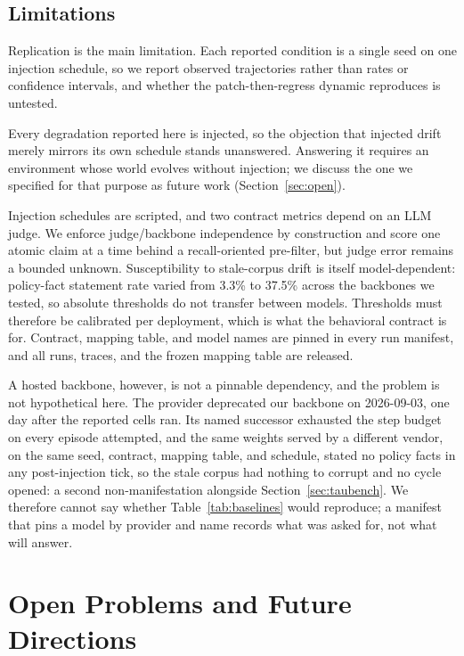 \documentclass[conference]{IEEEtran}
\begin{document}
\subsection{Limitations}
\label{sec:limitations}

Replication is the main limitation. Each reported condition is a single seed on
one injection schedule, so we report observed trajectories rather than rates or
confidence intervals, and whether the patch-then-regress dynamic reproduces is
untested.

Every degradation reported here is injected, so the objection that injected
drift merely mirrors its own schedule stands unanswered. Answering it requires
an environment whose world evolves without injection; we discuss the one we
specified for that purpose as future work (Section~\ref{sec:open}).

Injection schedules are scripted, and two contract metrics depend on an LLM
judge. We enforce judge/backbone independence by construction and score one
atomic claim at a time behind a recall-oriented pre-filter, but judge error
remains a bounded unknown. Susceptibility to stale-corpus drift is itself
model-dependent: policy-fact statement rate varied from 3.3\% to 37.5\% across
the backbones we tested, so absolute thresholds do not transfer between models.
Thresholds must therefore be calibrated per deployment, which is what the
behavioral contract is for. Contract, mapping table, and model names are pinned
in every run manifest, and all runs, traces, and the frozen mapping table are
released.

A hosted backbone, however, is not a pinnable dependency, and the problem is
not hypothetical here. The provider deprecated our backbone on 2026-09-03, one
day after the reported cells ran. Its named successor exhausted the step budget
on every episode attempted, and the same weights served by a different vendor,
on the same seed, contract, mapping table, and schedule, stated no policy facts
in any post-injection tick, so the stale corpus had nothing to corrupt and no
cycle opened: a second non-manifestation alongside Section~\ref{sec:taubench}.
We therefore cannot say whether Table~\ref{tab:baselines} would reproduce; a
manifest that pins a model by provider and name records what was asked for, not
what will answer.

\section{Open Problems and Future Directions}
\end{document}
